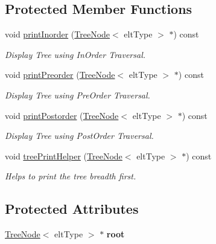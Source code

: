 \subsection*{Protected Member Functions}
\begin{DoxyCompactItemize}
\item 
void \hyperlink{classBinaryTree_a8a9a4a08e66b5712e85e5cd2b5a30449}{print\-Inorder} (\hyperlink{classTreeNode}{Tree\-Node}$<$ elt\-Type $>$ $\ast$) const 
\begin{DoxyCompactList}\small\item\em Display Tree using In\-Order Traversal. \end{DoxyCompactList}\item 
void \hyperlink{classBinaryTree_a1cfa4e25467fc86dc7e39e5d102ec018}{print\-Preorder} (\hyperlink{classTreeNode}{Tree\-Node}$<$ elt\-Type $>$ $\ast$) const 
\begin{DoxyCompactList}\small\item\em Display Tree using Pre\-Order Traversal. \end{DoxyCompactList}\item 
void \hyperlink{classBinaryTree_a6c73081dd682ad15d1c474d0e907eeac}{print\-Postorder} (\hyperlink{classTreeNode}{Tree\-Node}$<$ elt\-Type $>$ $\ast$) const 
\begin{DoxyCompactList}\small\item\em Display Tree using Post\-Order Traversal. \end{DoxyCompactList}\item 
void \hyperlink{classBinaryTree_a8e5db6297ddc5ee9d4229a39b0fb7a94}{tree\-Print\-Helper} (\hyperlink{classTreeNode}{Tree\-Node}$<$ elt\-Type $>$ $\ast$) const 
\begin{DoxyCompactList}\small\item\em Helps to print the tree breadth first. \end{DoxyCompactList}\end{DoxyCompactItemize}
\subsection*{Protected Attributes}
\begin{DoxyCompactItemize}
\item 
\hypertarget{classBinaryTree_a89df572c2c98d79570aeabfe2a74a987}{\hyperlink{classTreeNode}{Tree\-Node}$<$ elt\-Type $>$ $\ast$ {\bfseries root}}\label{classBinaryTree_a89df572c2c98d79570aeabfe2a74a987}

\end{DoxyCompactItemize}


